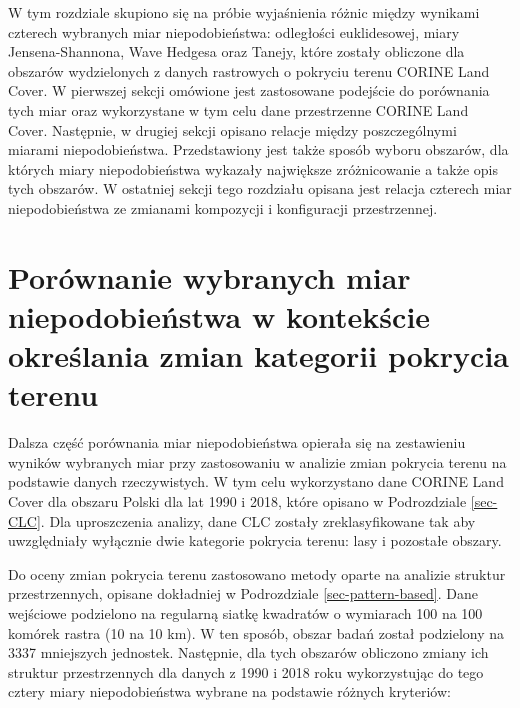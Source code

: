 \documentclass{amuthesis}
\begin{document}
W tym rozdziale skupiono się na próbie wyjaśnienia różnic między
wynikami czterech wybranych miar niepodobieństwa: odległości
euklidesowej, miary Jensena-Shannona, Wave Hedgesa oraz Tanejy, które
zostały obliczone dla obszarów wydzielonych z danych rastrowych o
pokryciu terenu CORINE Land Cover. W pierwszej sekcji omówione jest
zastosowane podejście do porównania tych miar oraz wykorzystane w tym
celu dane przestrzenne CORINE Land Cover. Następnie, w drugiej sekcji
opisano relacje między poszczególnymi miarami niepodobieństwa.
Przedstawiony jest także sposób wyboru obszarów, dla których miary
niepodobieństwa wykazały największe zróżnicowanie a także opis tych
obszarów. W ostatniej sekcji tego rozdziału opisana jest relacja
czterech miar niepodobieństwa ze zmianami kompozycji i konfiguracji
przestrzennej.

\hypertarget{poruxf3wnanie-wybranych-miar-niepodobieux144stwa-w-kontekux15bcie-okreux15blania-zmian-kategorii-pokrycia-terenu}{%
\section{Porównanie wybranych miar niepodobieństwa w kontekście
określania zmian kategorii pokrycia
terenu}\label{poruxf3wnanie-wybranych-miar-niepodobieux144stwa-w-kontekux15bcie-okreux15blania-zmian-kategorii-pokrycia-terenu}}

Dalsza część porównania miar niepodobieństwa opierała się na zestawieniu
wyników wybranych miar przy zastosowaniu w analizie zmian pokrycia
terenu na podstawie danych rzeczywistych. W tym celu wykorzystano dane
CORINE Land Cover dla obszaru Polski dla lat 1990 i 2018, które opisano
w Podrozdziale \ref{sec-CLC}. Dla uproszczenia analizy, dane CLC zostały
zreklasyfikowane tak aby uwzględniały wyłącznie dwie kategorie pokrycia
terenu: lasy i pozostałe obszary.

Do oceny zmian pokrycia terenu zastosowano metody oparte na analizie
struktur przestrzennych, opisane dokładniej w Podrozdziale
\ref{sec-pattern-based}. Dane wejściowe podzielono na regularną siatkę
kwadratów o wymiarach 100 na 100 komórek rastra (10 na 10 km). W ten
sposób, obszar badań został podzielony na 3337 mniejszych jednostek.
Następnie, dla tych obszarów obliczono zmiany ich struktur
przestrzennych dla danych z 1990 i 2018 roku wykorzystując do tego
cztery miary niepodobieństwa wybrane na podstawie różnych kryteriów:
\end{document}
